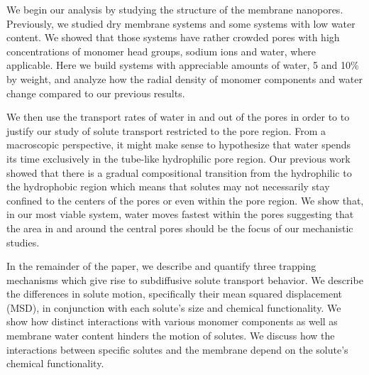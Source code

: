 \documentclass[journal=jpcbfk,manuscript=article]{achemso}
\begin{document}
  
  We begin our analysis by studying the structure of the membrane nanopores.
  Previously, we studied dry membrane systems and some systems with low water
  content. We showed that those systems have rather crowded pores with high
  concentrations of monomer head groups, sodium ions and water, where applicable.
  Here we build systems with appreciable amounts of water, 5 and 10\% by weight,
  and analyze how the radial density of monomer components and water change
  compared to our previous results.

  We then use the transport rates of water in and out of the pores in order to
  to justify our study of solute transport restricted to the pore region. From a 
  macroscopic perspective, it might make sense to hypothesize that water spends its time 
  exclusively in the tube-like hydrophilic pore region. Our previous work showed
  that there is a gradual compositional transition from the hydrophilic to the
  hydrophobic region which means that solutes may not necessarily stay confined
  to the centers of the pores or even within the pore region. We show that, in 
  our most viable system, water moves fastest within the pores suggesting that 
  the 
  area in and around the central
  pores should be the focus of our mechanistic studies.
  
  

  In the remainder of the paper, we describe and quantify three trapping 
  mechanisms which give rise to subdiffusive solute transport behavior. 
  We describe the differences in solute motion, specifically their mean
  squared displacement (MSD), in conjunction with each solute's size and 
  chemical functionality. We show how distinct interactions with various
  monomer components as well as membrane water content hinders the motion 
  of solutes. We discuss how the interactions between specific solutes and
  the membrane depend on the solute's chemical functionality.
\end{document}
